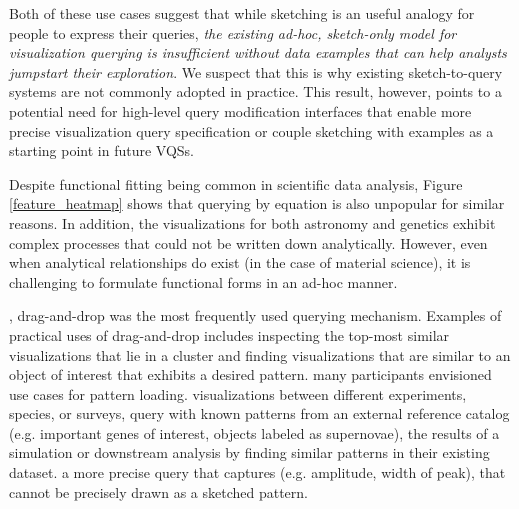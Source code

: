{\begin{figure}[ht!]
\end{figure}
\par Both of these use cases suggest that while sketching is an useful analogy for people to express their queries, \emph{the existing ad-hoc, sketch-only model for visualization querying is insufficient without data examples that can help analysts jumpstart their exploration}. We suspect that this is why existing sketch-to-query systems are not commonly adopted in practice. This result, however, points to a potential need for high-level query modification interfaces that enable more precise visualization query specification or couple sketching with examples as a starting point in future VQSs.} %
\par Despite functional fitting being common in scientific data analysis, Figure \ref{feature_heatmap} shows that querying by equation is also unpopular for similar reasons. In addition, the visualizations for both astronomy and genetics exhibit complex processes that could not be written down  analytically. However, even when analytical relationships do exist (in the case of material science), it is challenging to formulate functional forms in an  ad-hoc manner. %
\par {}, drag-and-drop was the most frequently used querying mechanism. Examples of practical uses of drag-and-drop includes inspecting the top-most similar visualizations that lie in a cluster and finding visualizations that are similar to an object of interest that exhibits a desired pattern.  many participants envisioned use cases for pattern loading.  visualizations between different experiments, species, or surveys, query with known patterns from an external reference catalog (e.g. important genes of interest, objects labeled as supernovae),  the results of a simulation or downstream analysis by finding similar patterns in their existing dataset.  a more precise query that captures  (e.g. amplitude, width of peak), that  cannot be precisely drawn as a sketched pattern. 
